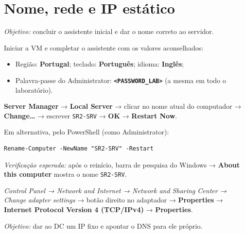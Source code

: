
\section[Nome, rede e IP estático]{Nome, rede e IP estático}



\emph{Objetivo:} concluir o assistente inicial e dar o nome correto ao servidor.

Iniciar a VM e completar o assistente com os valores aconselhados:

\begin{itemize}
\item Região: \textbf{Portugal}; teclado: \textbf{Português}; idioma: \textbf{Inglês};
\item Palavra-passe do Administrator: \textbf{\texttt{\textless{}PASSWORD\_LAB\textgreater{}}} (a mesma em todo o laboratório).
\end{itemize}


\textbf{Server Manager} → \textbf{Local Server} → clicar no nome atual do computador → \textbf{Change\ldots} → escrever \texttt{SR2-SRV} → \textbf{OK} → \textbf{Restart Now}.

Em alternativa, pelo PowerShell (como Administrator):

\begin{lstlisting}[style=psstyle]
Rename-Computer -NewName "SR2-SRV" -Restart
\end{lstlisting}

\emph{Verificação esperada:} após o reinício, barra de pesquisa do Windows → \textbf{About this computer} mostra o nome \texttt{SR2-SRV}.


\emph{Control Panel → Network and Internet → Network and Sharing Center → Change adapter settings} → botão direito no adaptador → \textbf{Properties} → \textbf{Internet Protocol Version 4 (TCP/IPv4)} → \textbf{Properties}.


\emph{Objetivo:} dar ao DC um IP fixo e apontar o DNS para ele próprio.

